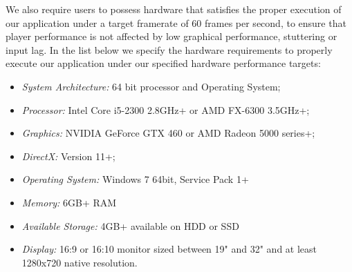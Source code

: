 We also require users to possess hardware that satisfies the proper execution of our application under a target framerate of 60 frames per second, to ensure that player performance is not affected by low graphical performance, stuttering or input lag. In the list below we specify the hardware requirements to properly execute our application under our specified hardware performance targets:
\begin{itemize}
    \item{\emph{System Architecture:} 64 bit processor and Operating System;}
    \item{\emph{Processor:} Intel Core i5-2300 2.8GHz+ or AMD FX-6300 3.5GHz+;}
    \item{\emph{Graphics:} NVIDIA GeForce GTX 460 or AMD Radeon 5000 series+;}
    \item{\emph{DirectX:} Version 11+;}
    \item{\emph{Operating System:} Windows 7 64bit, Service Pack 1+}
    \item{\emph{Memory:} 6GB+ RAM}
    \item{\emph{Available Storage:} 4GB+ available on HDD or SSD}
    \item{\emph{Display:} 16:9 or 16:10 monitor sized between 19" and 32" and at least 1280x720 native resolution.}
\end{itemize}

